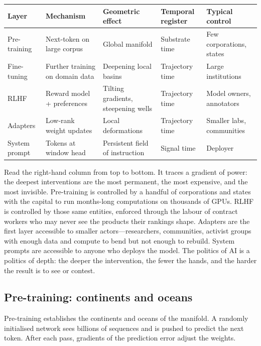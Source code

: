 \begin{formalbox}[title={Strata of the manifold}]
\begin{tabular}{@{}lllll@{}}
\toprule
\textbf{Layer} & \textbf{Mechanism} & \textbf{Geometric effect} & \textbf{Temporal register} & \textbf{Typical control} \\
\midrule
Pre-training   & Next-token on large corpus & Global manifold                & Substrate time & Few corporations, states \\
Fine-tuning    & Further training on domain data& Deepening local basins     & Trajectory time      & Large institutions        \\
RLHF           & Reward model + preferences & Tilting gradients, steepening wells & Trajectory time & Model owners, annotators  \\
Adapters       & Low-rank weight updates    & Local deformations             & Trajectory time      & Smaller labs, communities \\
System prompt  & Tokens at window head      & Persistent field of instruction& Signal time & Deployer                  \\
\bottomrule
\end{tabular}
\end{formalbox}

Read the right-hand column from top to bottom. It traces a gradient of power: the deepest interventions are the most permanent, the most expensive, and the most invisible. Pre-training is controlled by a handful of corporations and states with the capital to run months-long computations on thousands of GPUs. RLHF is controlled by those same entities, enforced through the labour of contract workers who may never see the products their rankings shape. Adapters are the first layer accessible to smaller actors---researchers, communities, activist groups with enough data and compute to bend but not enough to rebuild. System prompts are accessible to anyone who deploys the model. The politics of AI is a politics of depth: the deeper the intervention, the fewer the hands, and the harder the result is to see or contest.

\subsection{Pre-training: continents and oceans}

Pre-training establishes the continents and oceans of the manifold. A randomly initialised network sees billions of sequences and is pushed to predict the next token. After each pass, gradients of the prediction error adjust the weights.

